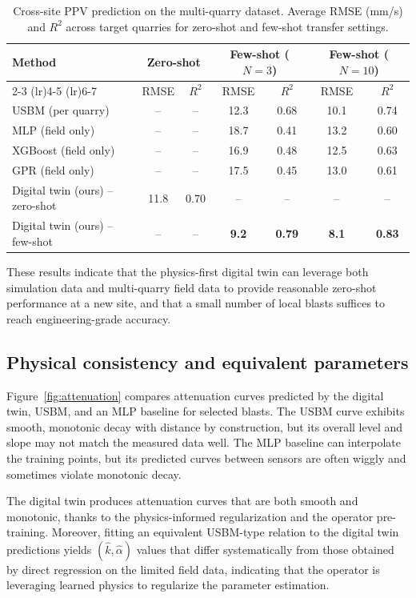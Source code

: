 \documentclass[a4paper,fleqn]{cas-sc}
\begin{document}
\begin{table}[t]
\centering
\caption{Cross-site PPV prediction on the multi-quarry dataset.
Average RMSE (mm/s) and $R^2$ across target quarries
for zero-shot and few-shot transfer settings.}
\label{tab:cross_site}
\begin{tabular}{lcccccc}
\toprule
\multirow{2}{*}{Method} &
\multicolumn{2}{c}{Zero-shot} &
\multicolumn{2}{c}{Few-shot ($N=3$)} &
\multicolumn{2}{c}{Few-shot ($N=10$)} \\
\cmidrule(lr){2-3} \cmidrule(lr){4-5} \cmidrule(lr){6-7}
& RMSE & $R^2$ & RMSE & $R^2$ & RMSE & $R^2$ \\
\midrule
USBM (per quarry)     &  --   & --   & 12.3 & 0.68 & 10.1 & 0.74 \\
MLP (field only)      &  --   & --   & 18.7 & 0.41 & 13.2 & 0.60 \\
XGBoost (field only)  &  --   & --   & 16.9 & 0.48 & 12.5 & 0.63 \\
GPR (field only)      &  --   & --   & 17.5 & 0.45 & 13.0 & 0.61 \\
\midrule
Digital twin (ours) -- zero-shot & 11.8 & 0.70 & --   & --   & --   & --   \\
Digital twin (ours) -- few-shot  & --   & --   & \textbf{9.2} & \textbf{0.79} & \textbf{8.1} & \textbf{0.83} \\
\bottomrule
\end{tabular}
\end{table}

These results indicate that the physics-first digital twin
can leverage both simulation data and multi-quarry field data
to provide reasonable zero-shot performance at a new site,
and that a small number of local blasts suffices to reach
engineering-grade accuracy.

\subsection{Physical consistency and equivalent parameters}

Figure~\ref{fig:attenuation} compares attenuation curves predicted by
the digital twin, USBM, and an MLP baseline for selected blasts.
The USBM curve exhibits smooth, monotonic decay with distance by construction,
but its overall level and slope may not match the measured data well.
The MLP baseline can interpolate the training points,
but its predicted curves between sensors are often wiggly
and sometimes violate monotonic decay.

The digital twin produces attenuation curves that are both smooth and monotonic,
thanks to the physics-informed regularization and the operator pre-training.
Moreover, fitting an equivalent USBM-type relation to the digital twin predictions
yields $(\hat{k},\hat{\alpha})$ values that differ systematically from
those obtained by direct regression on the limited field data,
indicating that the operator is leveraging learned physics to regularize
the parameter estimation.
\end{document}

